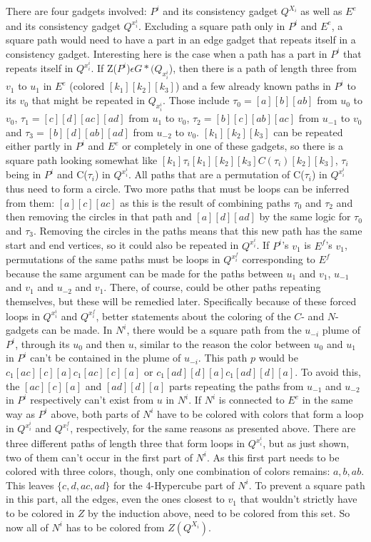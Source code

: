 \documentclass[12pt,a4paper]{article}
\begin{document}
There are four gadgets involved: $P^i$ and its consistency gadget $Q^{X_i}$ as well as $E^e$ and its consistency gadget $Q^{x^i_i}$. Excluding a square path only in $P^i$ and $E^e$, a square path would need to have a part in an edge gadget that repeats itself in a consistency gadget. Interesting here is the case when a path has a part in $P^i$ that repeats itself in $Q^{x^i_i}$. If Z($P^i$)$\epsilon G*(Q_{x^i_i}$), then there is a path of length three from $v_1$ to $u_1$ in $E^e$ (colored $[k_1][k_2][k_3]$) and a few already known paths in $P^i$ to its $v_0$ that might be repeated in $Q_{x^i_i}$. Those include $\tau_0 = [a][b][ab]$ from $u_0$ to $v_0$, $\tau_1 = [c][d][ac][ad]$ from $u_1$ to $v_0$, $\tau_2 = [b][c][ab][ac]$ from $u_{-1}$ to $v_0$ and $\tau_3 = [b][d][ab][ad]$ from $u_{-2}$ to $v_0$. $[k_1][k_2][k_3]$ can be repeated either partly in $P^i$ and $E^e$ or completely in one of these gadgets, so there is a square path looking somewhat like $[k_1]\tau_i[k_1][k_2][k_3]C(\tau_i)[k_2][k_3]$, $\tau_i$ being in $P^i$ and C($\tau_i$) in $Q^{x^i_i}$. All paths that are a permutation of C($\tau_i$) in $Q^{x^i_i}$ thus need to form a circle. Two more paths that must be loops can be inferred from them: $[a][c][ac]$ as this is the result of combining paths $\tau_0$ and $\tau_2$ and then removing the circles in that path and $[a][d][ad]$ by the same logic for $\tau_0$ and $\tau_3$. Removing the circles in the paths means that this new path has the same start and end vertices, so it could also be repeated in $Q^{x_i^i}$. If $P^i$'s $v_1$ is $E^f$'s $v_1$, permutations of the same paths must be loops in $Q^{x^f_i}$ corresponding to $E^f$ because the same argument can be made for the paths between $u_1$ and $v_1$, $u_{-1}$ and $v_1$ and $u_{-2}$ and $v_1$. There, of course, could be other paths repeating themselves, but these will be remedied later. Specifically because of these forced loops in $Q^{x_i^i}$ and $Q^{x^f_i}$, better statements about the coloring of the $C$- and $N$-gadgets can be made. 
\newline
In $N^i$, there would be a square path from the $u_{-i}$ plume of $P^i$, through its $u_0$ and then $u$, similar to the reason the color between $u_0$ and $u_1$ in $P^i$ can't be contained in the plume of $u_{-i}$. This path $p$ would be $c_1[ac][c][a]c_1[ac][c][a]$ or $c_1[ad][d][a]c_1[ad][d][a]$. To avoid this, the $[ac][c][a]$ and $[ad][d][a]$ parts repeating the paths from $u_{-1}$ and $u_{-2}$ in $P^i$ respectively can't exist from $u$ in $N^i$. If $N^i$ is connected to $E^e$ in the same way as $P^i$ above, both parts of $N^i$ have to be colored with colors that form a loop in $Q^{x^i_i}$ and $Q^{x^f_i}$, respectively, for the same reasons as presented above. There are three different paths of length three that form loops in $Q^{x^i_i}$, but as just shown, two of them can't occur in the first part of $N^i$. As this first part needs to be colored with three colors, though, only one combination of colors remains: ${a, b, ab}$. This leaves $ \{c, d, ac, ad \}$ for the 4-Hypercube part of $N^i$. To prevent a square path in this part, all the edges, even the ones closest to $v_1$ that wouldn't strictly have to be colored in $Z$ by the induction above, need to be colored from this set. So now all of $N^i$ has to be colored from $Z(Q^{X_i})$.
\end{document}
